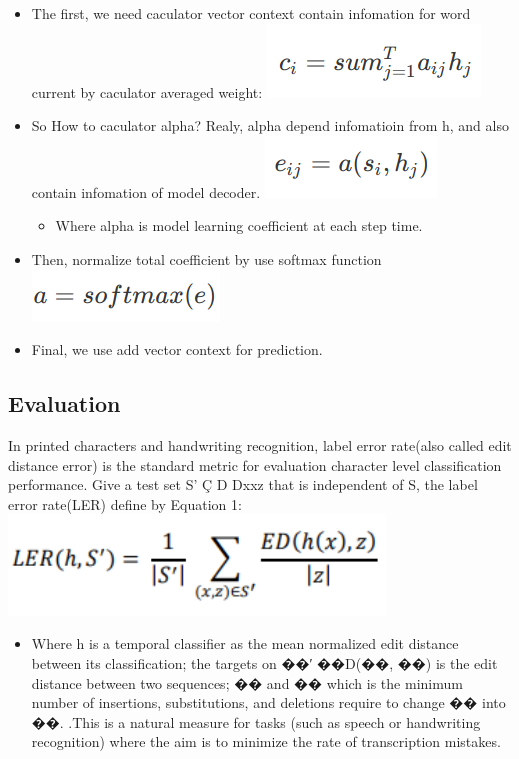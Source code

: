 \documentclass[14pt]{extarticle}
\newcommand{\<}{\langle}
\renewcommand{\>}{\rangle}
\theoremstyle{definition}
\begin{document}
\begin{itemize}
    \item The first, we need caculator vector context contain infomation for word current by caculator averaged weight:\newline
    \includegraphics{vector.png}
    \item So How to caculator alpha? Realy, alpha depend infomatioin from h, and also contain infomation of model decoder.\newline
    \includegraphics{alpha.png}
    \begin{itemize}
        \item Where alpha is model learning coefficient at each step time. 
    \end{itemize}
    \item Then, normalize total coefficient by use softmax function \newline
    \includegraphics{softmax.png}
    \item Final, we use add vector context for prediction. 
    
\end{itemize}

\subsection{Evaluation}
In printed characters and handwriting recognition, label error rate(also called edit distance error) is the standard metric for evaluation character level classification performance. Give a test set S’ Ç D Dxxz that is independent of S, the label error rate(LER) define by Equation 1:  \newline
\includegraphics[width=100mm,scale=0.7]{ler.png}
\begin{itemize}
    \item Where h is a temporal classifier as the mean normalized edit distance between its classification; the targets on ��′ ��D(��, ��) is the edit distance between two sequences; �� and �� which is the minimum number of insertions, substitutions, and deletions require to change �� into ��. .This is a natural measure for tasks (such as speech or handwriting recognition) where the aim is to minimize the rate of transcription mistakes. 
    
\end{itemize}
\end{document}
